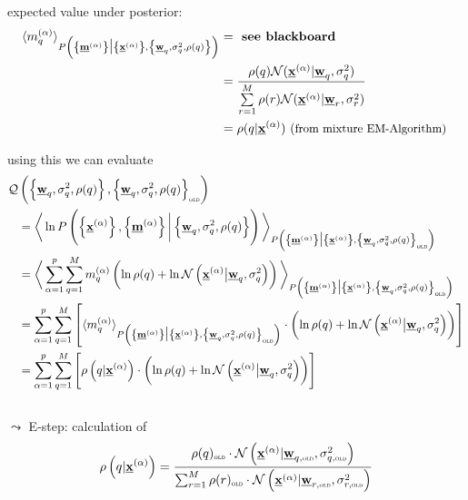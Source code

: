 expected value under posterior: \\
	\begin{align*}
	\langle m_q^{(\alpha)} \rangle_{ P \left( \left\{ \vec{m}^{(\alpha)} \right\} \big| \left\{ \vec{x}^{(\alpha)} \right\}, \left\{ \vec{w}_q, \sigma_q^2, \rho(q) \right\} \right) } &= \textbf{ see blackboard}
	\\&= \frac{\rho(q) \mathcal{N}(\vec{x}^{(\alpha)} | \vec{w}_q, \sigma_q^2)}{\sum\limits_{r=1}^{M}  \rho(r) \mathcal{N}(\vec{x}^{(\alpha)}  | \vec{w}_r, \sigma_r^2)} 
	\\ &= \rho(q | \vec{x}^{(\alpha)}) \text{ (\small{from mixture EM-Algorithm) }}
	\end{align*}
	
	\newcommand{\OLD}{\textnormal{\tiny \textsc{old}}}
	using this we can evaluate\\
	\vspace{-0.4cm}
	\begin{align*}
	\mathcal{Q}  &\left(  \left\{ \vec{w}_q, \sigma_q^2, \rho(q) \right\}, \left\{ \vec{w}_q, \sigma_q^2, \rho(q) \right\}_{\OLD} \right) 
	\\&= \bigg\langle \ln P \left( \left\{ \vec{x}^{(\alpha)} \right\}, \left\{ \vec{m}^{(\alpha)} \right\} \bigg| \left\{ \vec{w}_q, \sigma_q^2, \rho(q) \right\} \right) \bigg\rangle_{ P \left( \left\{ \vec{m}^{(\alpha)} \right\} \big| \left\{ \vec{x}^{(\alpha)} \right\}, \left\{ \vec{w}_q, \sigma_q^2, \rho(q) \right\}_\OLD \right) }
	\\ &= \bigg\langle \sum_{\alpha=1}^{p} \sum_{q=1}^{M} m_q^{(\alpha)} \left(  \ln \rho(q) + \ln \mathcal{N}\left( \vec{x}^{(\alpha)} \big| \vec{w}_q, \sigma_q^2 \right) \right) \bigg\rangle_{ P \left( \left\{ \vec{m}^{(\alpha)} \right\} \big| \left\{ \vec{x}^{(\alpha)} \right\}, \left\{ \vec{w}_q, \sigma_q^2, \rho(q) \right\}_\OLD \right) }
	\\& = \sum_{\alpha=1}^{p} \sum_{q=1}^{M} \left[ \langle m_q^{(\alpha)} \rangle_{ P \left( \left\{ \vec{m}^{(\alpha)} \right\} \big| \left\{ \vec{x}^{(\alpha)} \right\}, \left\{ \vec{w}_q, \sigma_q^2, \rho(q) \right\}_\OLD \right) } \cdot \left(  \ln \rho(q) + \ln \mathcal{N}\left( \vec{x}^{(\alpha)} \big| \vec{w}_q, \sigma_q^2 \right) \right) \right]
	\\& = \sum_{\alpha=1}^{p} \sum_{q=1}^{M} \left[ \rho \left( q | \vec{x}^{(\alpha)} \right) \cdot \left(  \ln \rho(q) + \ln \mathcal{N}\left( \vec{x}^{(\alpha)} \big| \vec{w}_q, \sigma_q^2 \right) \right)  \right]
	\end{align*}\\
	\vspace{1mm}
	$\leadsto$ E-step: calculation of 
	\begin{equation*}
	\rho \left( q | \vec{x}^{(\alpha)} \right) = \frac{ \rho(q)_\OLD \cdot \mathcal{N} \left(\vec{x}^{(\alpha)} | \vec{w}_{q, \OLD}  , \sigma_{q,\OLD}^2  \right) }{  \sum_{r=1}^{M} \rho(r)_\OLD \cdot \mathcal{N} \left(\vec{x}^{(\alpha)} | \vec{w}_{r,\OLD}  , \sigma_{r,\OLD}^2  \right) }
	\end{equation*}
	
